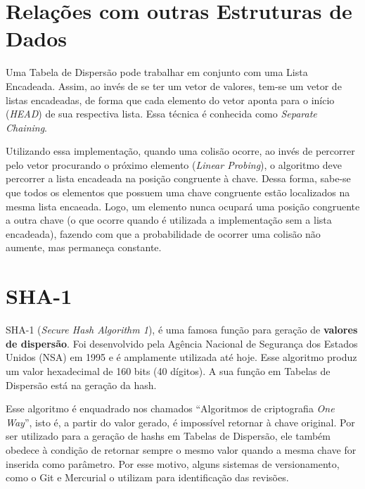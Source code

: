 \documentclass[12pt,openright,oneside,a4paper,english,brazil]{abntex2}
\begin{document}
\section*{Relações com outras Estruturas de Dados}
    Uma Tabela de Dispersão pode trabalhar em conjunto com uma Lista Encadeada. Assim, ao invés de se ter um vetor de valores, tem-se um vetor de listas encadeadas, de forma que cada elemento do vetor aponta para o início (\textit{HEAD}) de sua respectiva lista. Essa técnica é conhecida como \textit{Separate Chaining}.

    Utilizando essa implementação, quando uma colisão ocorre, ao invés de percorrer pelo vetor procurando o próximo elemento (\textit{Linear Probing}), o algoritmo deve percorrer a lista encadeada na posição congruente à chave.
    Dessa forma, sabe-se que todos os elementos que possuem uma chave congruente estão localizados na mesma lista encaeada. Logo, um elemento nunca ocupará uma posição congruente a outra chave (o que ocorre quando é utilizada a implementação sem a lista encadeada), fazendo com que a probabilidade de ocorrer uma colisão não aumente, mas permaneça constante.

\section*{SHA-1}
    SHA-1 (\textit{Secure Hash Algorithm 1}), é uma famosa função para geração de \textbf{valores de dispersão}.
    Foi desenvolvido pela Agência Nacional de Segurança dos Estados Unidos (NSA) em 1995 e é amplamente utilizada até hoje.
    Esse algoritmo produz um valor hexadecimal de 160 bits (40 dígitos).
    A sua função em Tabelas de Dispersão está na geração da hash.

    Esse algoritmo é enquadrado nos chamados ``Algoritmos de criptografia \textit{One Way}'', isto é, a partir do valor gerado, é impossível retornar à chave original.
    Por ser utilizado para a geração de hashs em Tabelas de Dispersão, ele também obedece à condição de retornar sempre o mesmo valor quando a mesma chave for inserida como parâmetro.
    Por esse motivo, alguns sistemas de versionamento, como o Git e Mercurial o utilizam para identificação das revisões.
\end{document}
